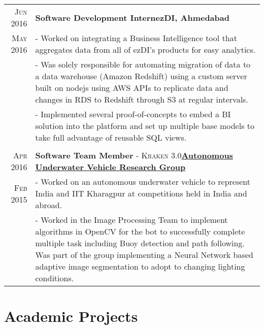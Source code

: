 \documentclass[a4paper,10pt]{extarticle} %
\begin{document}
\begin{tabular}{r|p{17cm}}

\textsc{Jun 2016} & \textbf{Software Development Intern}\hfill\textbf{ezDI, Ahmedabad}\\
\textsc{May 2016}& \footnotesize{- Worked on integrating a Business Intelligence tool that aggregates data from all of ezDI's products for easy analytics.}\\
& \footnotesize{- Was solely responsible for automating migration of data to a data warehouse (Amazon Redshift) using a custom server built on nodejs using AWS APIs to replicate data and changes in RDS to Redshift through S3 at regular intervals.}\\
& \footnotesize{- Implemented several proof-of-concepts to embed a BI solution into the platform and set up multiple base models to take full advantage of reusable SQL views.}\\
\multicolumn{2}{c}{} \\

\textsc{Apr 2016} & \textbf{Software Team Member} \textsc{- Kraken 3.0}\hfill\textbf{\href{http://auv-iitkgp.in/}{Autonomous Underwater Vehicle Research Group}}\\
\textsc{Feb 2015} & \footnotesize{- Worked on an autonomous underwater vehicle to represent India and IIT Kharagpur at competitions held in India and abroad.}\\
& \footnotesize{- Worked in the Image Processing Team to implement algorithms in OpenCV for the bot to successfully complete multiple task including Buoy detection and path following. Was part of the group implementing a Neural Network based adaptive image segmentation to adopt to changing lighting conditions.}
\end{tabular}



\section{Academic Projects}
\end{document}
